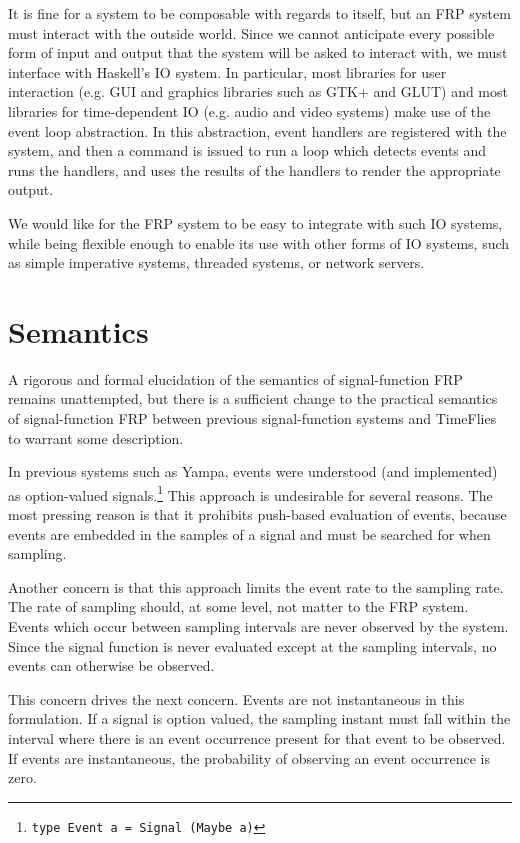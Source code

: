 It is fine for a system to be composable with regards to itself, but an FRP
system must interact with the outside world. Since we cannot anticipate every
possible form of input and output that the system will be asked to interact
with, we must interface with Haskell's IO system. In particular, most libraries
for user interaction (e.g. GUI and graphics libraries such as GTK+ and GLUT) and
most libraries for time-dependent IO (e.g. audio and video systems) make use of
the event loop abstraction. In this abstraction, event handlers are registered
with the system, and then a command is issued to run a loop which detects events
and runs the handlers, and uses the results of the handlers to render the
appropriate output. 

We would like for the FRP system to be easy to integrate with such IO systems,
while being flexible enough to enable its use with other forms of IO systems,
such as simple imperative systems, threaded systems, or network servers.

\section{Semantics}
\label{section:System_Design_and_Interface-Semantics}

A rigorous and formal elucidation of the semantics of signal-function FRP remains
unattempted, but there is a sufficient change to the practical semantics of
signal-function FRP between previous signal-function systems and TimeFlies to warrant
some description.

In previous systems such as Yampa, events were understood (and implemented) as
option-valued signals.\footnote{{\tt type Event a = Signal (Maybe a)}} This
approach is undesirable for several reasons. The most pressing reason is that it
prohibits push-based evaluation of events, because events are embedded in the
samples of a signal and must be searched for when sampling.

Another concern is that this approach limits the event rate to the sampling rate.
The rate of sampling should, at some level, not matter to the FRP system. Events
which occur between sampling intervals are never observed by the system. Since
the signal function is never evaluated except at the sampling intervals, no
events can otherwise be observed.

This concern drives the next concern. Events are not instantaneous in this formulation.
If a signal is option valued, the sampling instant must fall within the interval where
there is an event occurrence present for that event to be observed. If events are
instantaneous, the probability of observing an event occurrence is zero.

